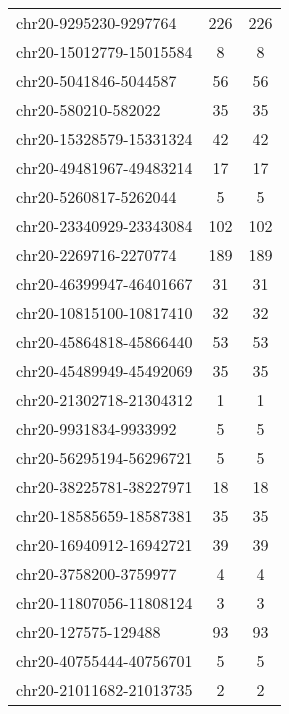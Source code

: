 \begin{longtable}{lSS}
	chr20-9295230-9297764   & 226  & 226                             \\
	chr20-15012779-15015584 & 8    & 8                               \\
	chr20-5041846-5044587   & 56   & 56                              \\
	chr20-580210-582022     & 35   & 35                              \\
	chr20-15328579-15331324 & 42   & 42                              \\
	chr20-49481967-49483214 & 17   & 17                              \\
	chr20-5260817-5262044   & 5    & 5                               \\
	chr20-23340929-23343084 & 102  & 102                             \\
	chr20-2269716-2270774   & 189  & 189                             \\
	chr20-46399947-46401667 & 31   & 31                              \\
	chr20-10815100-10817410 & 32   & 32                              \\
	chr20-45864818-45866440 & 53   & 53                              \\
	chr20-45489949-45492069 & 35   & 35                              \\
	chr20-21302718-21304312 & 1    & 1                               \\
	chr20-9931834-9933992   & 5    & 5                               \\
	chr20-56295194-56296721 & 5    & 5                               \\
	chr20-38225781-38227971 & 18   & 18                              \\
	chr20-18585659-18587381 & 35   & 35                              \\
	chr20-16940912-16942721 & 39   & 39                              \\
	chr20-3758200-3759977   & 4    & 4                               \\
	chr20-11807056-11808124 & 3    & 3                               \\
	chr20-127575-129488     & 93   & 93                              \\
	chr20-40755444-40756701 & 5    & 5                               \\
	chr20-21011682-21013735 & 2    & 2                               \\

\end{longtable}
